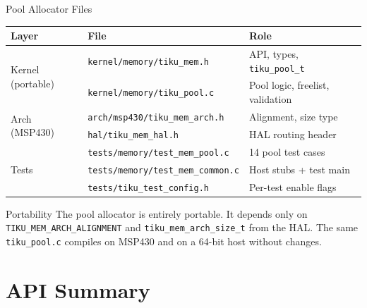 \documentclass[aspectratio=169, 10pt]{beamer}
\begin{document}
\begin{frame}[fragile]{Pool Allocator Files}
\begin{table}
\centering
\small
\begin{tabular}{@{}lll@{}}
\toprule
\textbf{Layer} & \textbf{File} & \textbf{Role} \\
\midrule
\multirow{2}{*}{Kernel (portable)}
  & \texttt{kernel/memory/tiku\_mem.h} & API, types, \texttt{tiku\_pool\_t} \\
  & \texttt{kernel/memory/tiku\_pool.c} & Pool logic, freelist, validation \\
\midrule
\multirow{2}{*}{Arch (MSP430)}
  & \texttt{arch/msp430/tiku\_mem\_arch.h} & Alignment, size type \\
  & \texttt{hal/tiku\_mem\_hal.h} & HAL routing header \\
\midrule
\multirow{3}{*}{Tests}
  & \texttt{tests/memory/test\_mem\_pool.c} & 14 pool test cases \\
  & \texttt{tests/memory/test\_mem\_common.c} & Host stubs + test main \\
  & \texttt{tests/tiku\_test\_config.h} & Per-test enable flags \\
\bottomrule
\end{tabular}
\end{table}

\vspace{0.5em}
\begin{block}{Portability}
The pool allocator is entirely portable. It depends only on
\texttt{TIKU\_MEM\_ARCH\_ALIGNMENT} and \texttt{tiku\_mem\_arch\_size\_t}
from the HAL. The same \texttt{tiku\_pool.c} compiles on MSP430 and
on a 64-bit host without changes.
\end{block}
\end{frame}

\section{API Summary}
\end{document}
